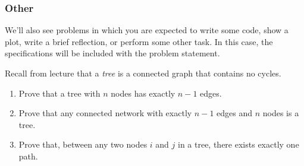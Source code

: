 \documentclass[11pt]{article}
\begin{document}
\begin{titlepage}
\subsubsection*{Other}

We'll also see problems in which you are expected to write some code, show a plot, write a brief reflection, or perform some other task. 
In this case, the specifications will be included with the problem statement. 


\end{titlepage}

\begin{tcolorbox}[title = 1. Trees]
Recall from lecture that a \emph{tree} is a connected graph that contains no cycles. 

\begin{enumerate}
    \item 
    Prove that a tree with $n$ nodes has exactly $n-1$ edges.

    \item 
    Prove that any connected network with exactly $n-1$ edges and $n$ nodes is a tree.

    \item
    Prove that, between any two nodes $i$ and $j$ in a tree, there exists exactly one path. 
\end{enumerate}
\end{tcolorbox}

\end{document}
